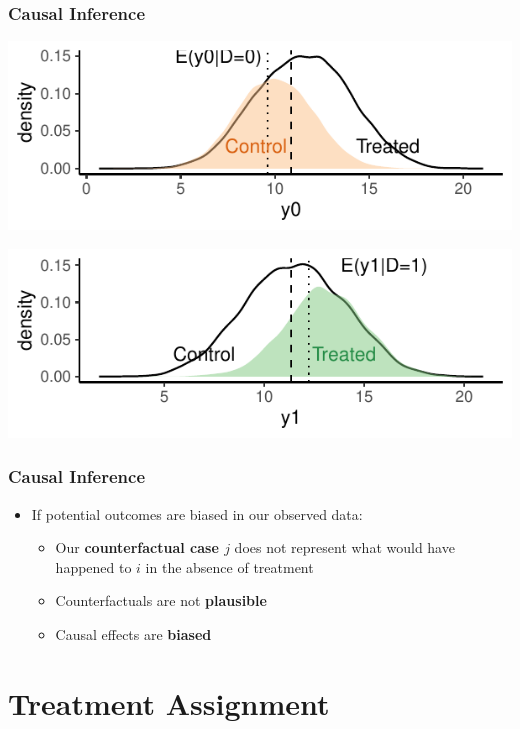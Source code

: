 \documentclass[xcolor=x11names,compress]{beamer}\usepackage[]{graphicx}\usepackage[]{xcolor}
\makeatletter
\def\maxwidth{ %
  \ifdim\Gin@nat@width>\linewidth
    \linewidth
  \else
    \Gin@nat@width
  \fi
}
\newenvironment{knitrout}{}{} %
\renewcommand{\(}{\begin{columns}}
\renewcommand{\)}{\end{columns}}
\newcommand{\<}[1]{\begin{column}{#1}}
\renewcommand{\>}{\end{column}}
\makeatother
\begin{document}
\begin{frame}
\frametitle{Causal Inference}
\begin{knitrout}
\color{fgcolor}
\includegraphics[width=\maxwidth]{figure/OVB1d-1} 
\end{knitrout}

\begin{knitrout}
\color{fgcolor}
\includegraphics[width=\maxwidth]{figure/OVB2d-1} 
\end{knitrout}
\end{frame}

\begin{frame}
\frametitle{Causal Inference}
\begin{itemize}
\item If potential outcomes are biased in our observed data:
\pause
\begin{itemize}
\item Our \textbf{counterfactual case $j$} does not represent what would have happened to $i$ in the absence of treatment
\pause
\item Counterfactuals are not \textbf{plausible}
\pause
\item Causal effects are \textbf{biased}
\end{itemize}
\end{itemize}
\end{frame}


\section{Treatment Assignment}
\end{document}

